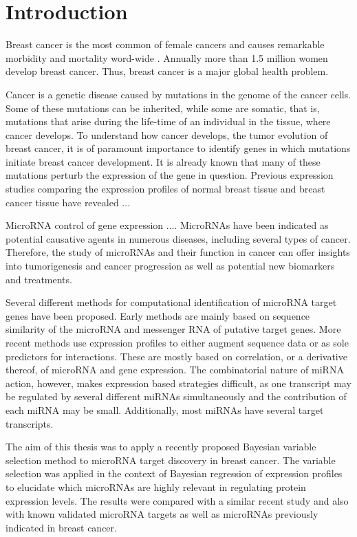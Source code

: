 
\section{Introduction}
\thispagestyle{empty}

Breast cancer is the most common of female cancers and causes remarkable
morbidity and mortality word-wide \citep{??}.  Annually more than 1.5 million
women develop breast cancer. Thus, breast cancer is a major global health
problem.

Cancer is a genetic disease caused by mutations in the genome of the cancer
cells. Some of these mutations can be inherited, while some are somatic, that
is, mutations that arise during the life-time of an individual in the tissue,
where cancer develops. To understand how cancer develops, the tumor evolution
of breast cancer, it is of paramount importance to identify genes in which
mutations initiate breast cancer development. It is already known that many of
these mutations perturb the expression of the gene in question. Previous
expression studies comparing the expression profiles of normal breast tissue
and breast cancer tissue have revealed ...

MicroRNA control of gene expression .... MicroRNAs have been indicated as
potential causative agents in numerous diseases, including several types of
cancer. Therefore, the study of microRNAs and their function in cancer can
offer insights into tumorigenesis and cancer progression as well as potential
new biomarkers and treatments.

Several different methods for computational identification of microRNA target
genes have been proposed. Early methods are mainly based on sequence similarity of the
microRNA and messenger RNA of putative target genes. More recent methods use
expression profiles to either augment sequence data or as sole predictors for
interactions. These are mostly based on correlation, or a derivative thereof,
of microRNA and gene expression. The combinatorial nature of miRNA action, however,
makes expression based strategies difficult, as one transcript may be regulated
by several different miRNAs simultaneously and the contribution of each
miRNA may be small. Additionally, most miRNAs have several target transcripts.

The aim of this thesis was to apply a recently proposed Bayesian variable
selection method to microRNA target discovery in breast cancer. The variable
selection was applied in the context of Bayesian regression of expression
profiles to elucidate which microRNAs are highly relevant in regulating
protein expression levels. The results were compared with a similar recent
study and also with known validated microRNA targets as well as microRNAs
previously indicated in breast cancer.
